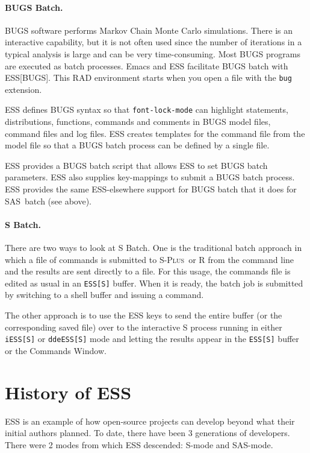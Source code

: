 \documentclass{article}
\newcommand*{\SAS}{\textsc{SAS}}
\newcommand*{\Splus}{\textsc{S-Plus}}
\newcommand{\stexttt}[1]{{\small\texttt{#1}}}
\begin{document}
\paragraph{BUGS Batch.}
\label{sec:bugs-batch}
  
BUGS software performs Markov Chain Monte Carlo simulations.  There is an 
interactive capability, but it is not often used since the number of iterations
in a typical analysis is large and can be very time-consuming.  Most BUGS 
programs are executed as batch processes.  Emacs and ESS facilitate BUGS batch 
with ESS[BUGS].  This RAD environment starts when you open a file with the 
\stexttt{bug} extension.

ESS defines BUGS syntax so that \stexttt{font-lock-mode} can highlight
statements, distributions, functions, commands and comments in BUGS
model files, command files and log files.  ESS creates templates
for the command file from the model file so that a BUGS batch process
can be defined by a single file.

ESS provides a BUGS batch script that allows ESS to set BUGS batch 
parameters.  ESS also supplies key-mappings to submit a BUGS batch
process.  ESS provides the same ESS-elsewhere support for BUGS batch
that it does for \SAS\ batch (see above).

\paragraph{S Batch.}
There are two ways to look at S Batch.  One is the traditional batch
approach in which a file of commands is submitted to \Splus\ or R from
the command line and the results are sent directly to a file.  For
this usage, the commands file is edited as usual in an \stexttt{ESS[S]}
buffer.  When it is ready, the batch job is submitted by switching to a
shell buffer and issuing a command.

The other approach is to use the ESS keys to send the entire buffer
(or the corresponding saved file) over to the interactive S process
running in either \stexttt{iESS[S]} or \stexttt{ddeESS[S]} mode and
letting the results appear in the \stexttt{ESS[S]} buffer or the
Commands Window.


\section{History of ESS}
\label{sec:ESS:history}

ESS is an example of how open-source projects can develop beyond what 
their initial authors planned.  To date, there have been 3 generations 
of developers.
There were 2 modes from which ESS descended:  S-mode and SAS-mode.
\end{document}
